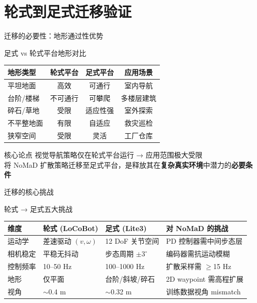 \documentclass[aspectratio=169,10pt]{beamer}
\newcommand{\smalltable}{\fontsize{7.5}{10}\selectfont}
\begin{document}
\section{轮式到足式迁移验证}

\begin{frame}{迁移的必要性：地形通过性优势}
\begin{block}{足式 vs 轮式平台地形对比}
\centering
\begin{tabular}{lccc}
\toprule
\textbf{地形类型} & \textbf{轮式平台} & \textbf{足式平台} & \textbf{应用场景} \\
\midrule
平坦地面 &  高效 &  可通行 & 室内导航 \\
台阶/楼梯 &  不可通行 &  可攀爬 & 多楼层建筑 \\
碎石/草地 &  受限 &  适应性强 & 室外探索 \\
不平整地面 &  有限 &  自适应 & 救灾巡检 \\
狭窄空间 &  受限 &  灵活 & 工厂仓库 \\
\bottomrule
\end{tabular}
\end{block}
\vspace{4mm}
\begin{alertblock}{核心论点}
\centering
视觉导航策略仅在轮式平台运行 → 应用范围极大受限\\[1mm]
将 NoMaD 扩散策略迁移至足式平台，是释放其在\textbf{复杂真实环境}中潜力的\textbf{必要条件}
\end{alertblock}
\end{frame}

\begin{frame}{迁移的核心挑战}
\begin{block}{轮式 → 足式五大挑战}
\centering
\smalltable
\begin{tabular}{p{1.5cm}p{2.8cm}p{2.8cm}p{4.8cm}}
\toprule
\textbf{维度} & \textbf{轮式 (LoCoBot)} & \textbf{足式 (Lite3)} & \textbf{对 NoMaD 的挑战} \\
\midrule
运动学 & 差速驱动 $(v,\omega)$ & 12 DoF 关节空间 & PD 控制器需中间步态层 \\
相机稳定 & 平稳无抖动 & 步态周期 $\pm 3^{\circ}$ & 编码器需抗运动模糊 \\
控制频率 & 10--50 Hz & 100--1000 Hz & 扩散采样需 $\geq$15 Hz \\
地形 & 仅平面 & 台阶/斜坡/碎石 & 2D waypoint 需高程扩展 \\
视角 & $\sim$0.4 m & $\sim$0.32 m & 训练数据视角 mismatch \\
\bottomrule
\end{tabular}
\end{block}
\end{frame}
\end{document}
